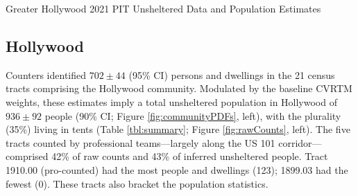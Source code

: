 \documentclass[11pt,twocolumn]{article}
\begin{document}

\begin{table}[t!]
\caption{Greater Hollywood 2021 PIT Unsheltered Data and Population Estimates}
\caption*{Parentheses denote 90\% uncertainties (binomial in the case of the categories). 
Uncertainties larger than estimates imply that only upper limits are available. Marginalized
upper limits are obtainable from the results file and imply $<$3 unaccompanied minors and
$<$3 unsheltered families in either community.}
\label{tbl:summary}
\end{table}


\subsection{Hollywood}
\label{sec:hWood}

Counters identified $702\pm44$ (95\% CI) persons and dwellings in the 21 census tracts 
comprising the Hollywood community. Modulated by the baseline CVRTM weights, these 
estimates imply a total unsheltered population in Hollywood of $936\pm92$ people 
(90\% CI; Figure \ref{fig:communityPDFs}, left), with the plurality (35\%) living in tents 
(Table \ref{tbl:summary}; Figure \ref{fig:rawCounts}, left). The five tracts counted by professional 
teams---largely along the US 101 corridor---comprised 42\% of raw counts and 43\% of inferred 
unsheltered people. Tract 1910.00 (pro-counted) had the most people and dwellings (123); 
1899.03 had the fewest (0). These tracts also bracket the population statistics. 
\end{document}
